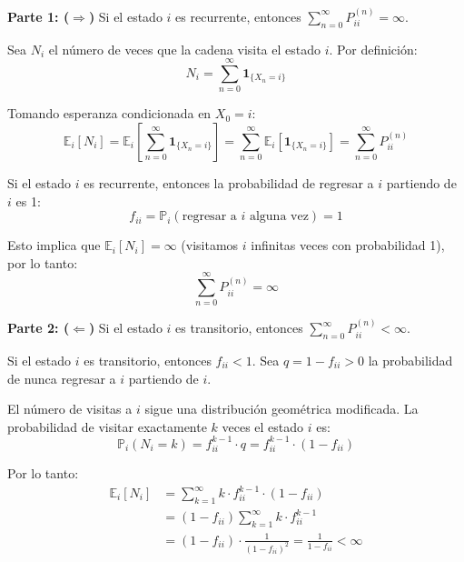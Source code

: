 \documentclass[12pt,a4paper]{article}
\begin{document}
\textbf{Parte 1: ($\Rightarrow$)} Si el estado $i$ es recurrente, entonces $\sum_{n=0}^{\infty} P_{ii}^{(n)} = \infty$.

Sea $N_i$ el número de veces que la cadena visita el estado $i$. Por definición:
\begin{equation*}
N_i = \sum_{n=0}^{\infty} \mathbf{1}_{\{X_n = i\}}
\end{equation*}

Tomando esperanza condicionada en $X_0 = i$:
\begin{equation*}
\mathbb{E}_i[N_i] = \mathbb{E}_i\left[\sum_{n=0}^{\infty} \mathbf{1}_{\{X_n = i\}}\right] = \sum_{n=0}^{\infty} \mathbb{E}_i[\mathbf{1}_{\{X_n = i\}}] = \sum_{n=0}^{\infty} P_{ii}^{(n)}
\end{equation*}

Si el estado $i$ es recurrente, entonces la probabilidad de regresar a $i$ partiendo de $i$ es 1:
\begin{equation*}
f_{ii} = \mathbb{P}_i(\text{regresar a } i \text{ alguna vez}) = 1
\end{equation*}

Esto implica que $\mathbb{E}_i[N_i] = \infty$ (visitamos $i$ infinitas veces con probabilidad 1), por lo tanto:
\begin{equation*}
\sum_{n=0}^{\infty} P_{ii}^{(n)} = \infty
\end{equation*}

\textbf{Parte 2: ($\Leftarrow$)} Si el estado $i$ es transitorio, entonces $\sum_{n=0}^{\infty} P_{ii}^{(n)} < \infty$.

Si el estado $i$ es transitorio, entonces $f_{ii} < 1$. Sea $q = 1 - f_{ii} > 0$ la probabilidad de nunca regresar a $i$ partiendo de $i$.

El número de visitas a $i$ sigue una distribución geométrica modificada. La probabilidad de visitar exactamente $k$ veces el estado $i$ es:
\begin{equation*}
\mathbb{P}_i(N_i = k) = f_{ii}^{k-1} \cdot q = f_{ii}^{k-1} \cdot (1 - f_{ii})
\end{equation*}

Por lo tanto:
\begin{align*}
\mathbb{E}_i[N_i] &= \sum_{k=1}^{\infty} k \cdot f_{ii}^{k-1} \cdot (1 - f_{ii}) \\
&= (1 - f_{ii}) \sum_{k=1}^{\infty} k \cdot f_{ii}^{k-1} \\
&= (1 - f_{ii}) \cdot \frac{1}{(1 - f_{ii})^2} = \frac{1}{1 - f_{ii}} < \infty
\end{align*}
\end{document}
